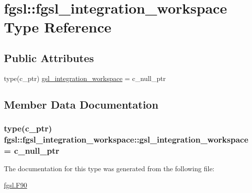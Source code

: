 \hypertarget{structfgsl_1_1fgsl__integration__workspace}{\section{fgsl\-:\-:fgsl\-\_\-integration\-\_\-workspace Type Reference}
\label{structfgsl_1_1fgsl__integration__workspace}
}
\subsection*{Public Attributes}
\begin{DoxyCompactItemize}
\item 
type(c\-\_\-ptr) \hyperlink{structfgsl_1_1fgsl__integration__workspace_ac3ed878e23d5dbe66978795ca92bb996}{gsl\-\_\-integration\-\_\-workspace} = c\-\_\-null\-\_\-ptr
\end{DoxyCompactItemize}


\subsection{Member Data Documentation}
\hypertarget{structfgsl_1_1fgsl__integration__workspace_ac3ed878e23d5dbe66978795ca92bb996}{
\subsubsection[{gsl\-\_\-integration\-\_\-workspace}]{\setlength{\rightskip}{0pt plus 5cm}type(c\-\_\-ptr) fgsl\-::fgsl\-\_\-integration\-\_\-workspace\-::gsl\-\_\-integration\-\_\-workspace = c\-\_\-null\-\_\-ptr}}\label{structfgsl_1_1fgsl__integration__workspace_ac3ed878e23d5dbe66978795ca92bb996}


The documentation for this type was generated from the following file\-:\begin{DoxyCompactItemize}
\item 
\hyperlink{fgsl_8F90}{fgsl.\-F90}\end{DoxyCompactItemize}
